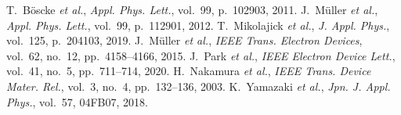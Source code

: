 \documentclass[conference]{IEEEtran}
\begin{document}

\begin{thebibliography}{99}
 T.~Böscke \emph{et al.}, \emph{Appl. Phys. Lett.}, vol.~99, p.~102903, 2011.
 J.~Müller \emph{et al.}, \emph{Appl. Phys. Lett.}, vol.~99, p.~112901, 2012.
 T.~Mikolajick \emph{et al.}, \emph{J. Appl. Phys.}, vol.~125, p.~204103, 2019.
 J.~Müller \emph{et al.}, \emph{IEEE Trans. Electron Devices}, vol.~62, no.~12, pp.~4158--4166, 2015.
 J.~Park \emph{et al.}, \emph{IEEE Electron Device Lett.}, vol.~41, no.~5, pp.~711--714, 2020.
 H.~Nakamura \emph{et al.}, \emph{IEEE Trans. Device Mater. Rel.}, vol.~3, no.~4, pp.~132--136, 2003.
 K.~Yamazaki \emph{et al.}, \emph{Jpn. J. Appl. Phys.}, vol.~57, 04FB07, 2018.
\end{thebibliography}
\end{document}
